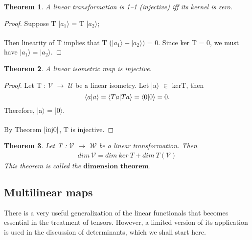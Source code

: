 \documentclass[12pt,a4paper]{article}
\newtheorem{thm}{Theorem}
\begin{document}
\begin{thm} \label{inj0}
A linear transformation is 1–1 (injective) iff its kernel is
zero.
\end{thm}
\begin{proof}
Suppose T |$a_1\rangle$ = T |$a_2\rangle$; \\\\Then linearity of T implies that T ($|a_1\rangle - |a_2\rangle)$ = 0. Since ker T = 0, we must have $|a_1\rangle = |a_2 \rangle$.
\end{proof}
\begin{thm} \label{inj}
A linear isometric map is injective.
\end{thm}
\begin{proof}
Let T : $\mathcal{V}$ $\to$ $\mathcal{U}$ be a linear isometry. Let |a$\rangle$ $\in$ kerT, then
\begin{equation}
\braket{a | a} = \braket{Ta | Ta} = \braket{0|0} = 0.
\end{equation}
Therefore, |a$\rangle$ = |0$\rangle$.\\\\
By Theorem $\ref{inj0}$, T is injective.
\end{proof}
\begin{thm} \label{dimthm}
Let T : $\mathcal{V}$ $\to$ $\mathcal{W}$ be a linear transformation. Then
\begin{align*}
dim\ \mathcal{V} = dim\ ker\ T + dim\ T(\mathcal{V})
\end{align*}
This theorem is called the $\textbf{dimension theorem}$.
\end{thm}
\subsection{Multilinear maps}
There is a very useful generalization of the linear functionals that becomes essential in the treatment of tensors. However, a limited version of its application is used in the discussion of determinants, which we shall start here.
\end{document}
